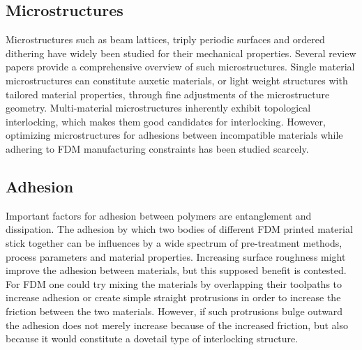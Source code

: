 \subsection{Microstructures}
Microstructures such as beam lattices, triply periodic surfaces and ordered dithering have widely been studied for their mechanical properties.
Several review papers provide a comprehensive overview of such microstructures.\cite{Cadman2013,Zhang2018a,tamburrino2018}
Single material microstructures can constitute auxetic materials, %
or light weight structures with tailored material properties, through fine adjustments of the microstructure geometry. %
Multi-material microstructures inherently exhibit topological interlocking, which makes them good candidates for interlocking\cite{freund2019determination}.
However, optimizing microstructures for adhesions between incompatible materials while adhering to FDM manufacturing constraints has been studied scarcely.



\subsection{Adhesion}

Important factors for adhesion between polymers are entanglement and dissipation\cite{abbott2015adhesion}.
The adhesion by which two bodies of different FDM printed material stick together can be influences by a wide spectrum of pre-treatment methods, process parameters and material properties\cite{freund2019determination}.
Increasing surface roughness might improve the adhesion between materials\cite{huttenbach1991interface,gent1990model}, but this supposed benefit is contested\cite{abbott2015adhesion}.
For FDM one could try mixing the materials by overlapping their toolpaths to increase adhesion or create simple straight protrusions in order to increase the friction between the two materials\cite{tamburrino19}.
However, if such protrusions bulge outward the adhesion does not merely increase because of the increased friction, but also because it would constitute a dovetail type of interlocking structure.



